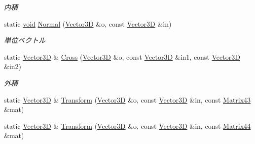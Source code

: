 \begin{DoxyCompactItemize}
\begin{DoxyCompactList}\small\item\em 内積 \end{DoxyCompactList}\item 
static \mbox{\hyperlink{namespace_effekseer_ab34c4088e512200cf4c2716f168deb56}{void}} \mbox{\hyperlink{struct_effekseer_1_1_vector3_d_ad798a45142e315748ff769ff6b0157f3}{Normal}} (\mbox{\hyperlink{struct_effekseer_1_1_vector3_d}{Vector3D}} \&o, const \mbox{\hyperlink{struct_effekseer_1_1_vector3_d}{Vector3D}} \&in)
\begin{DoxyCompactList}\small\item\em 単位ベクトル \end{DoxyCompactList}\item 
static \mbox{\hyperlink{struct_effekseer_1_1_vector3_d}{Vector3D}} \& \mbox{\hyperlink{struct_effekseer_1_1_vector3_d_a6af90fb7357d8ab977fd647f3bfd5c52}{Cross}} (\mbox{\hyperlink{struct_effekseer_1_1_vector3_d}{Vector3D}} \&o, const \mbox{\hyperlink{struct_effekseer_1_1_vector3_d}{Vector3D}} \&in1, const \mbox{\hyperlink{struct_effekseer_1_1_vector3_d}{Vector3D}} \&in2)
\begin{DoxyCompactList}\small\item\em 外積 \end{DoxyCompactList}\item 
static \mbox{\hyperlink{struct_effekseer_1_1_vector3_d}{Vector3D}} \& \mbox{\hyperlink{struct_effekseer_1_1_vector3_d_ae46e69eb77703cd01dc860d5024cec7d}{Transform}} (\mbox{\hyperlink{struct_effekseer_1_1_vector3_d}{Vector3D}} \&o, const \mbox{\hyperlink{struct_effekseer_1_1_vector3_d}{Vector3D}} \&in, const \mbox{\hyperlink{struct_effekseer_1_1_matrix43}{Matrix43}} \&mat)
\item 
static \mbox{\hyperlink{struct_effekseer_1_1_vector3_d}{Vector3D}} \& \mbox{\hyperlink{struct_effekseer_1_1_vector3_d_a036e8dd4bdd50963f889f6c885440e06}{Transform}} (\mbox{\hyperlink{struct_effekseer_1_1_vector3_d}{Vector3D}} \&o, const \mbox{\hyperlink{struct_effekseer_1_1_vector3_d}{Vector3D}} \&in, const \mbox{\hyperlink{struct_effekseer_1_1_matrix44}{Matrix44}} \&mat)
\end{DoxyCompactItemize}
